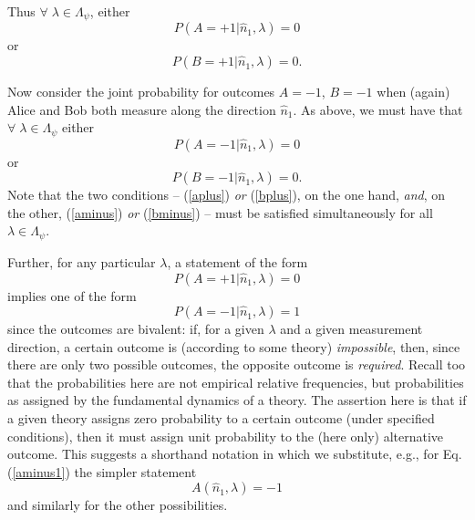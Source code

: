 \documentclass[aps,prc,onecolumn,12pt]{revtex4-2}
\begin{document}
Thus $\forall \; \lambda \in \Lambda_\psi$, either
\begin{equation}
P(A=+1 | \hat{n}_1, \lambda) = 0
\label{aplus}
\end{equation}
 or
\begin{equation}
P(B=+1 | \hat{n}_1, \lambda) = 0.
\label{bplus}
\end{equation}

Now consider the joint probability for outcomes $A = -1$, $B=-1$ when
(again) Alice and Bob both measure along the direction $\hat{n}_1$.
As above, we must have
that $ \forall \; \lambda \in \Lambda_\psi$ either
\begin{equation}
P(A=-1 | \hat{n}_1, \lambda) = 0
\label{aminus}
\end{equation}
or
\begin{equation}
P(B=-1 | \hat{n}_1, \lambda) = 0.
\label{bminus}
\end{equation}
Note that the two conditions -- (\ref{aplus}) \emph{or} (\ref{bplus}), on the
one hand, \emph{and}, on the other, (\ref{aminus}) \emph{or} (\ref{bminus})
-- must be satisfied simultaneously for all $\lambda \in \Lambda_\psi$.

Further, for any particular $\lambda$, a statement
of the form
\begin{equation}
P(A=+1 | \hat{n}_1, \lambda)=0
\end{equation}
implies one of the form
\begin{equation}
P(A=-1 | \hat{n}_1, \lambda) = 1
\label{aminus1}
\end{equation}
since the outcomes are bivalent:  if, for a given $\lambda$ and a
given measurement direction, a certain outcome is (according to some
theory) \emph{impossible},
then, since there are only two possible outcomes,
the opposite outcome is \emph{required}.  Recall too that the
probabilities here are not empirical relative frequencies, but
probabilities as assigned by the fundamental dynamics of a theory.
The assertion
here is that if a given theory assigns zero probability to a
certain outcome (under specified conditions), then it must assign
unit probability to the (here only) alternative outcome.  This
suggests a shorthand notation in which we substitute, e.g.,
for Eq. (\ref{aminus1}) the simpler statement
\begin{equation}
A(\hat{n}_1, \lambda) = -1
\label{aisminus1}
\end{equation}
and similarly for the other possibilities.
\end{document}
